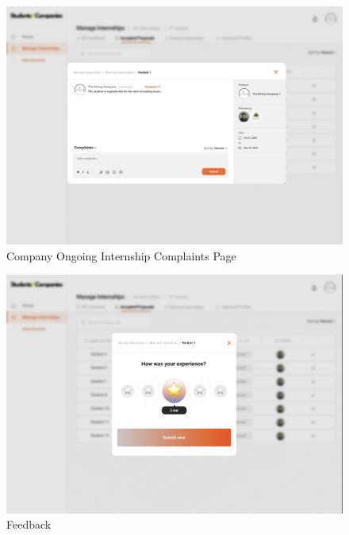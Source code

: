 \documentclass[a4paper,12pt]{article}
\begin{document}
\begin{figure}[H]
    \centering
    \includegraphics[scale = 0.42]{figures/UserInterfaces/Company/CompanyComplaints.png}
    \caption{Company Ongoing Internship Complaints Page}
     \centering
\end{figure}
\begin{figure}[H]
    \centering
    \includegraphics[scale = 0.42]{figures/UserInterfaces/Company/FeedbackCompany.png}
    \caption{Feedback}
     \centering
\end{figure}
\end{document}

